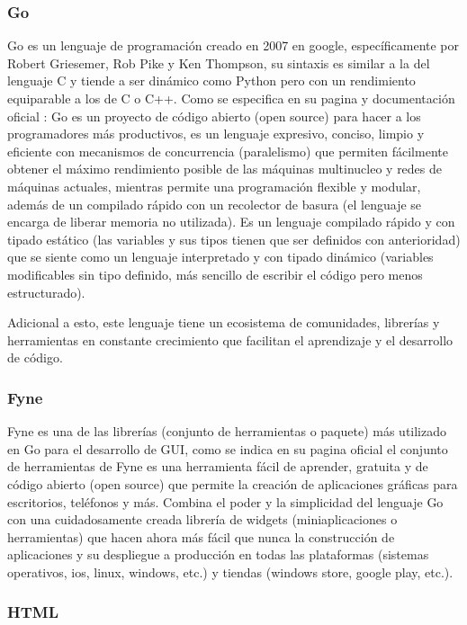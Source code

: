 \subsubsection{Go}
Go es un lenguaje de programación creado en 2007 en google, específicamente por
Robert Griesemer, Rob Pike y Ken Thompson, su sintaxis es similar a la del lenguaje
C y tiende a ser dinámico como Python pero con un rendimiento equiparable a los
de C o C++. Como se especifica en su pagina y documentación oficial
\cite{GolangDocumentacion}: Go es un proyecto de código abierto (open source)
para hacer a los programadores más productivos, es un lenguaje expresivo, conciso,
limpio y eficiente con mecanismos de concurrencia (paralelismo) que permiten fácilmente
obtener el máximo rendimiento posible de las máquinas multinucleo y redes de máquinas
actuales, mientras permite una programación flexible y modular, además de un compilado
rápido con un recolector de basura (el lenguaje se encarga de liberar memoria
no utilizada).
Es un lenguaje compilado rápido y con tipado estático (las variables y sus tipos tienen que
ser definidos con anterioridad) que se siente como un lenguaje interpretado y
con tipado dinámico (variables modificables sin tipo definido, más sencillo de
escribir el código pero menos estructurado).

Adicional a esto, este lenguaje tiene un ecosistema de comunidades, librerías y
herramientas en constante crecimiento que facilitan el aprendizaje y el desarrollo
de código.

\subsubsection{Fyne}

Fyne es una de las librerías (conjunto de herramientas o paquete) más utilizado
en Go para el desarrollo de GUI, como se indica en su pagina oficial \cite{fyne}
el conjunto de herramientas de Fyne es una herramienta fácil de aprender, gratuita
y de código abierto (open source) que permite la creación de aplicaciones gráficas
para escritorios, teléfonos y más. Combina el poder y la simplicidad del lenguaje
Go con una cuidadosamente creada librería de widgets (miniaplicaciones o herramientas)
que hacen ahora más fácil que nunca la construcción de aplicaciones y su despliegue
a producción en todas las plataformas (sistemas operativos, ios, linux, windows, etc.)
y tiendas (windows store, google play, etc.).

\subsubsection{HTML}


